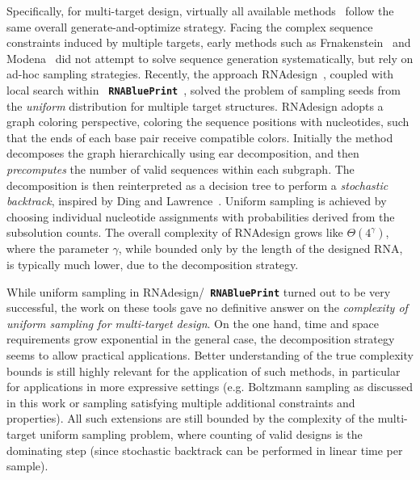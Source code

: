 \documentclass{bmcart}
\newcommand{\Def}[1]{\emph{#1}}
\newcommand{\parHead}[1]{\Final{\paragraph{#1}}}
\newcommand{\Final}[1]{\begingroup\color{red!70!black}#1\endgroup}
\renewcommand{\Final}[1]{}
\newcommand{\Software}[1]{{\ttfamily #1}}
\newcommand{\RNAblueprint}{{\tt \bfseries{}\color{black!85} RNA\textcolor{blue!70!black}{Blue}Print}}
\newcommand{\citep}[1]{\cite{#1}}
\begin{document}
\parHead{Specificities and similarities of multi-target design.}
Specifically, for multi-target design, virtually all available methods~\citep{Lyngsoe2012,HoenerzuSiederdissen2013,Taneda2015,Hammer2017} follow the same overall generate-and-optimize strategy.
%
Facing the complex sequence constraints induced by multiple targets, early methods such as \Software{Frnakenstein}~\citep{Lyngsoe2012} and \Software{Modena}~\citep{Taneda2015} did not attempt to solve sequence generation systematically, but rely on ad-hoc sampling strategies.
%
Recently, the approach \Software{RNAdesign}~\citep{HoenerzuSiederdissen2013}, coupled with local
search within \RNAblueprint{}~\citep{Hammer2017}, solved the
problem of sampling seeds from the \emph{uniform} distribution for multiple
target structures. \Software{RNAdesign} adopts a graph coloring perspective,
coloring the sequence positions with nucleotides, such that the ends of each base pair receive compatible colors. Initially the method decomposes the graph hierarchically using ear decomposition, and then \Def{precomputes} the number of valid sequences
within each subgraph. The decomposition is then reinterpreted as a
decision tree to perform a \Def{stochastic backtrack}, inspired by
Ding and Lawrence~\citep{Ding2003}. Uniform sampling is achieved by
choosing individual nucleotide assignments with probabilities derived
from the subsolution counts. The overall complexity of
\Software{RNAdesign} grows like $\Theta(4^{\gamma})$, where the
parameter $\gamma$, while bounded only by the length of the designed RNA, is 
typically much lower, due to the decomposition strategy.

\parHead{Motivation.} 
While uniform sampling in \Software{RNAdesign}/\RNAblueprint{} turned out to be very successful,
the work on these tools gave no definitive answer on the \emph{complexity of uniform sampling for multi-target design}. On the one hand, time and space requirements grow exponential in the general case,
the decomposition strategy seems to allow practical applications.
Better understanding of the true complexity bounds is still highly relevant for the application of such methods, in particular for applications in more expressive settings (e.g. Boltzmann sampling as discussed in this work or sampling satisfying multiple additional constraints and properties). All such extensions are still bounded by the complexity of the multi-target uniform sampling problem, where counting of valid designs is the dominating step (since stochastic backtrack can be performed in linear time per sample).
\end{document}

